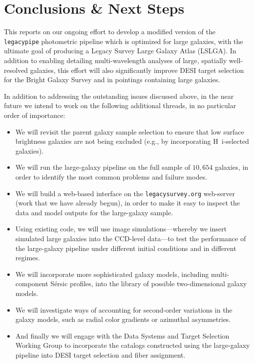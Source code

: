 \section{Conclusions \& Next Steps}\label{sec:summary}

This \tnote{} reports on our ongoing effort to develop a modified version of the
{\tt legacypipe} photometric pipeline which is optimized for large galaxies,
with the ultimate goal of producing a Legacy Survey Large Galaxy Atlas (LSLGA).
In addition to enabling detailing multi-wavelength analyses of large, spatially
well-resolved galaxies, this effort will also significantly improve DESI target
selection for the Bright Galaxy Survey and in pointings containing large
galaxies.

In addition to addressing the outstanding issues discussed above, in the near
future we intend to work on the following additional threads, in no particular
order of importance:
\begin{itemize}
\item{We will revisit the parent galaxy sample selection to ensure that low
  surface brightness galaxies are not being excluded (e.g., by incorporating
  H~{\sc i}-selected galaxies).}
\item{We will run the large-galaxy pipeline on the full sample of $10,654$
  galaxies, in order to identify the most common problems and failure modes.}
\item{We will build a web-based interface on the {\tt legacysurvey.org}
  web-server (work that we have already begun), in order to make it easy to
  inspect the data and model outputs for the large-galaxy sample.}
\item{Using existing code, we will use image simulations---whereby we insert
  simulated large galaxies into the CCD-level data---to test the performance of
  the large-galaxy pipeline under different initial conditions and in different
  regimes.}
\item{We will incorporate more sophisticated galaxy models, including
  multi-component S\'{e}rsic profiles, into the library of possible
  two-dimensional galaxy models.}
\item{We will investigate ways of accounting for second-order variations in the
  galaxy models, such as radial color gradients or azimuthal asymmetries.}
\item{And finally we will engage with the Data Systems and Target Selection
  Working Group to incorporate the catalogs constructed using the large-galaxy
  pipeline into DESI target selection and fiber assignment.}
\end{itemize}

